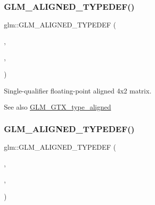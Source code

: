 \subsubsection{\texorpdfstring{G\+L\+M\+\_\+\+A\+L\+I\+G\+N\+E\+D\+\_\+\+T\+Y\+P\+E\+D\+E\+F()}{GLM\_ALIGNED\_TYPEDEF()}\hspace{0.1cm}{\footnotesize\ttfamily [178/209]}}
{\footnotesize\ttfamily glm\+::\+G\+L\+M\+\_\+\+A\+L\+I\+G\+N\+E\+D\+\_\+\+T\+Y\+P\+E\+D\+EF (\begin{DoxyParamCaption}\item[{\hyperlink{group__gtc__type__precision_ga279cf309f0098c3d26ce88fe8a26375a}{fmat4x2}}]{,  }\item[{aligned\+\_\+fmat4x2}]{,  }\item[{16}]{ }\end{DoxyParamCaption})}

Single-\/qualifier floating-\/point aligned 4x2 matrix. \begin{DoxySeeAlso}{See also}
\hyperlink{group__gtx__type__aligned}{G\+L\+M\+\_\+\+G\+T\+X\+\_\+type\+\_\+aligned} 
\end{DoxySeeAlso}
\mbox{\label{group__gtx__type__aligned_ga7c117e3ecca089e10247b1d41d88aff9}} 
\subsubsection{\texorpdfstring{G\+L\+M\+\_\+\+A\+L\+I\+G\+N\+E\+D\+\_\+\+T\+Y\+P\+E\+D\+E\+F()}{GLM\_ALIGNED\_TYPEDEF()}\hspace{0.1cm}{\footnotesize\ttfamily [179/209]}}
{\footnotesize\ttfamily glm\+::\+G\+L\+M\+\_\+\+A\+L\+I\+G\+N\+E\+D\+\_\+\+T\+Y\+P\+E\+D\+EF (\begin{DoxyParamCaption}\item[{\hyperlink{group__gtc__type__precision_ga0ab797a258612fe48345951a0bdd6b8c}{fmat4x3}}]{,  }\item[{aligned\+\_\+fmat4x3}]{,  }\item[{16}]{ }\end{DoxyParamCaption})}

